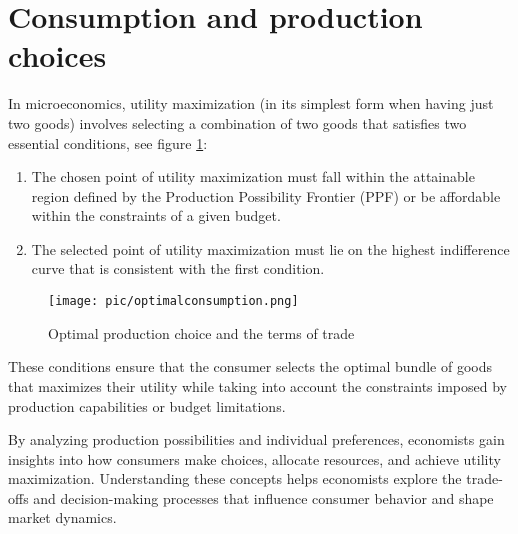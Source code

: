 


\pbn
\section{Consumption and production choices}\label{consumption-and-production-choices}

In microeconomics, utility maximization (in its simplest form when having just two goods) involves selecting a combination of two goods that satisfies two essential conditions, see figure \ref{fig:optimalconsumption}:

\begin{enumerate}
	\item
	The chosen point of utility maximization must fall within the attainable region defined by the Production Possibility Frontier (PPF) or be affordable within the constraints of a given budget.
	\item
	The selected point of utility maximization must lie on the highest indifference curve that is consistent with the first condition.
\end{enumerate}

\begin{figure}
	\centering
	\texttt{[image: pic/optimalconsumption.png]}
	\caption{\label{fig:optimalconsumption} Optimal production choice and the terms of trade}
\end{figure}

These conditions ensure that the consumer selects the optimal bundle of goods that maximizes their utility while taking into account the constraints imposed by production capabilities or budget limitations.

By analyzing production possibilities and individual preferences, economists gain insights into how consumers make choices, allocate resources, and achieve utility maximization. Understanding these concepts helps economists explore the trade-offs and decision-making processes that influence consumer behavior and shape market dynamics.

